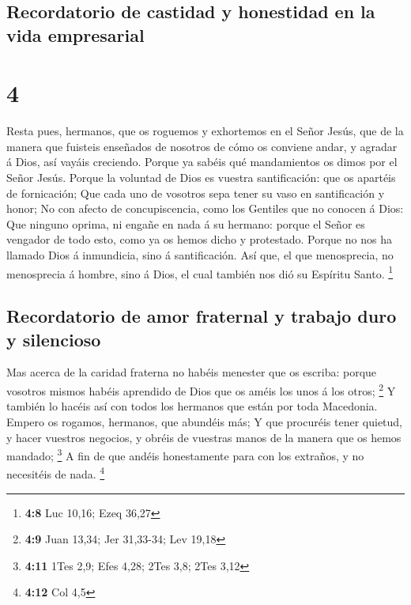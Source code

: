 \hypertarget{recordatorio-de-castidad-y-honestidad-en-la-vida-empresarial}{%
\subsection{Recordatorio de castidad y honestidad en la vida
empresarial}\label{recordatorio-de-castidad-y-honestidad-en-la-vida-empresarial}}

\hypertarget{section-3}{%
\section{4}\label{section-3}}

 Resta pues, hermanos, que os roguemos y exhortemos en el
Señor Jesús, que de la manera que fuisteis enseñados de nosotros de cómo
os conviene andar, y agradar á Dios, así vayáis creciendo.
 Porque ya sabéis qué mandamientos os dimos por el Señor
Jesús.  Porque la voluntad de Dios es vuestra
santificación: que os apartéis de fornicación;  Que cada
uno de vosotros sepa tener su vaso en santificación y honor;
 No con afecto de concupiscencia, como los Gentiles que no
conocen á Dios:  Que ninguno oprima, ni engañe en nada á
su hermano: porque el Señor es vengador de todo esto, como ya os hemos
dicho y protestado.  Porque no nos ha llamado Dios á
inmundicia, sino á santificación.  Así que, el que
menosprecia, no menosprecia á hombre, sino á Dios, el cual también nos
dió su Espíritu Santo. \footnote{\textbf{4:8} Luc 10,16; Ezeq 36,27}

\hypertarget{recordatorio-de-amor-fraternal-y-trabajo-duro-y-silencioso}{%
\subsection{Recordatorio de amor fraternal y trabajo duro y
silencioso}\label{recordatorio-de-amor-fraternal-y-trabajo-duro-y-silencioso}}

 Mas acerca de la caridad fraterna no habéis menester que
os escriba: porque vosotros mismos habéis aprendido de Dios que os améis
los unos á los otros; \footnote{\textbf{4:9} Juan 13,34; Jer 31,33-34;
  Lev 19,18}  Y también lo hacéis así con todos los
hermanos que están por toda Macedonia. Empero os rogamos, hermanos, que
abundéis más;  Y que procuréis tener quietud, y hacer
vuestros negocios, y obréis de vuestras manos de la manera que os hemos
mandado; \footnote{\textbf{4:11} 1Tes 2,9; Efes 4,28; 2Tes 3,8; 2Tes
  3,12}  A fin de que andéis honestamente para con los
extraños, y no necesitéis de nada. \footnote{\textbf{4:12} Col 4,5}

